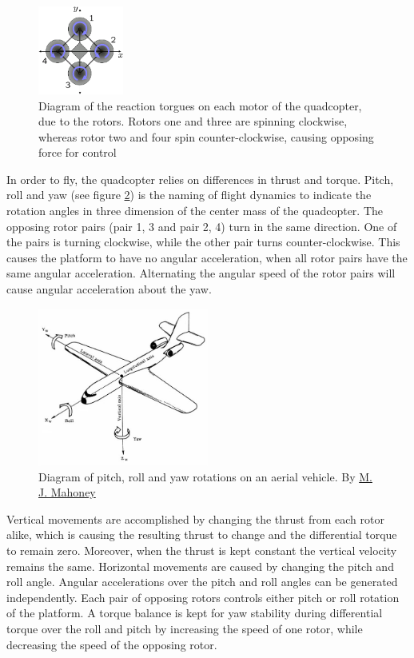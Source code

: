 \documentclass[a4paper]{article}
\begin{document}
\begin{appendices}
\begin{figure}[!ht]
	\centering
	\includegraphics[width=0.25\textwidth]{images/quadcopter.png}
	\caption{Diagram of the reaction torgues on each motor of the quadcopter, due to the rotors. Rotors one and three are spinning clockwise, whereas rotor two and four spin counter-clockwise, causing opposing force for control}
	\label{quadcopter}
\end{figure}

In order to fly, the quadcopter relies on differences in thrust and torque. Pitch, roll and yaw (see figure \ref{plane}) is the naming of flight dynamics to indicate the rotation angles in three dimension of the center mass of the quadcopter. The opposing rotor pairs (pair 1, 3 and pair 2, 4) turn in the same direction. One of the pairs is turning clockwise, while the other pair turns counter-clockwise. This causes the platform to have no angular acceleration, when all rotor pairs have the same angular acceleration. Alternating the angular speed of the rotor pairs will cause angular acceleration about the yaw.

\begin{figure}[!ht]
	\centering
	\includegraphics[width=0.5\textwidth]{images/plane.jpg}
	\caption[plane]{Diagram of pitch, roll and yaw rotations on an aerial vehicle. By \href{http://mtp.mjmahoney.net/www/notes/pointing/pointing.html}{M. J. Mahoney}}
	\label{plane}
\end{figure}

Vertical movements are accomplished by changing the thrust from each rotor alike, which is causing the resulting thrust to change and the differential torque to remain zero. Moreover, when the thrust is kept constant the vertical velocity remains the same. Horizontal movements are caused by changing the pitch and roll angle. Angular accelerations over the pitch and roll angles can be generated independently. Each pair of opposing rotors controls either pitch or roll rotation of the platform. A torque balance is kept for yaw stability during differential torque over the roll and pitch by increasing the speed of one rotor, while decreasing the speed of the opposing rotor.


\end{appendices}
\end{document}
